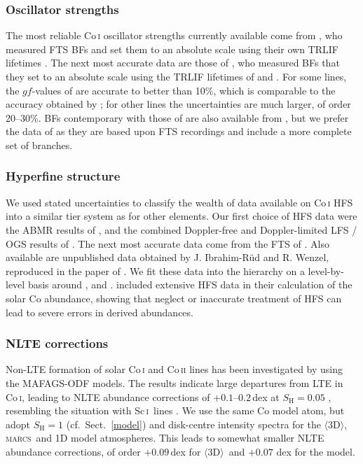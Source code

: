 \documentclass[traditabstract]{aa}
\newcommand{\oneDAV}{$\langle\mathrm{3D}\rangle$}
\newcommand{\marcs}{\textsc{marcs}}
\newcommand{\altsci}{Sc\,\textsc{i}}
\newcommand{\scani}{\altsci\ }
\begin{document}
\subsubsection{Oscillator strengths}
\label{Cogfs}

The most reliable Co\,\textsc{i} oscillator strengths currently available come from \citet{Nitz99}, who measured
FTS BFs and set them to an absolute scale using their own TRLIF lifetimes \citep{Nitz95}. The next most accurate
data are those of \citet{Cardon82}, who measured BFs that they set to an absolute
scale using the TRLIF lifetimes of \citet{Marek77} and \citet{Figger75}.  
For some lines, the $gf$-values of \citet{Cardon82} are accurate to better than 10\%, which
is comparable to the accuracy obtained by \citet{Nitz99}; for other lines the uncertainties are much larger, of 
order 20--30\%. BFs contemporary with those of \citet{Cardon82} are also available from 
\citet{Guern82}, but we prefer the data of \citeauthor{Cardon82} as they are based upon FTS recordings and include
a more complete set of branches.

\subsubsection{Hyperfine structure}
\label{Cohfs}

We used stated uncertainties to classify the wealth of data available on Co\,\textsc{i} HFS into a similar tier system as
for other elements.  Our first choice of HFS data were the ABMR results of \citet{Childs68}, and the combined Doppler-free
and Doppler-limited LFS / OGS results of \citet{Guthlorien90}.  The next most accurate data come from the FTS of
\citet{Pickering96a}.  Also available are unpublished data obtained by J. Ibrahim-R\"ud and R. Wenzel, reproduced in 
the paper of \citet{Guthlorien90}.  
We fit these data into the hierarchy on a level-by-level
basis around \citet{Guthlorien90}, \citet{Pickering96a} and \citet{Childs68}.
\citet{Bergemann10Co} included extensive HFS data in their calculation of the solar Co abundance, showing that neglect or inaccurate treatment of HFS can lead to severe
errors in derived abundances.

\subsubsection{NLTE corrections}
\label{CoNLTE}

Non-LTE formation of solar Co\,\textsc{i} and Co\,\textsc{ii} lines has been investigated by \citet{Bergemann10Co} using the MAFAGS-ODF models. The results indicate large departures from LTE in Co\,\textsc{i}, leading to NLTE abundance corrections of $+0.1$--$0.2$\,dex at $S_\mathrm{H}=0.05$ \citep[][cf.~their Table 4]{Bergemann10Co}, resembling the situation with \scani lines \citep{Zhang08}. We use the same Co model atom, but adopt $S_\mathrm{H}=1$ (cf.\ Sect.\ \ref{model}) and disk-centre intensity spectra for the \oneDAV , \marcs\ and  1D model atmospheres.  This leads to somewhat smaller NLTE abundance corrections, of order $+0.09$\,dex for \oneDAV\ and $+0.07$ dex for the  model.
\end{document}
